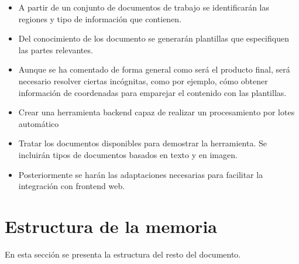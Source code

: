 \begin{itemize}
    \item A partir de un conjunto de documentos de trabajo se identificarán las regiones y tipo de información que contienen.
    \item Del conocimiento de los documento se generarán plantillas que especifiquen las partes relevantes.
    \item Aunque se ha comentado de forma general como será el producto final, será necesario resolver ciertas incógnitas, como por ejemplo, cómo obtener información de coordenadas para emparejar el contenido con las plantillas.
    \item Crear una herramienta backend capaz de realizar un procesamiento por lotes automático
    \item Tratar los documentos disponibles para demostrar la herramienta. Se incluirán tipos de documentos basados en texto y en imagen.
    \item Posteriormente se harán las adaptaciones necesarias para facilitar la integración con frontend web.
\end{itemize}

\section{Estructura de la memoria}

En esta sección se presenta la estructura del resto del documento.


